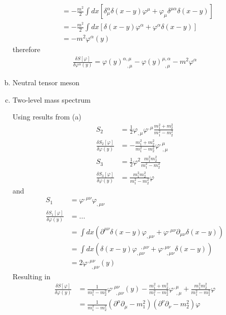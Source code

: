 \documentclass[../main.tex]{subfiles}
\begin{document}
\begin{enumerate}[(a)]
\begin{align}
&=-\frac{m^2}{2}\int dx\left[\delta_\mu^\alpha\delta(x-y)\varphi^\mu+\varphi_\mu\delta^{\mu\alpha}\delta(x-y)\right]\\
&=-\frac{m^2}{2}\int dx\left[\delta(x-y)\varphi^\alpha+\varphi^\alpha\delta(x-y)\right]\\
&=-m^2\varphi^\alpha(y)
\end{align}
therefore
\begin{align}
\frac{\delta S[\varphi]}{\delta\varphi^\alpha(y)}=\varphi(y)^{\alpha,\mu}_{\;\;\;,\mu}-\varphi(y)^{\mu,\alpha}_{\;\;,\mu}-m^2\varphi^\alpha
\end{align}

\item Neutral tensor meson

\item Two-level mass spectrum

Using results from (a)
\begin{align}
S_2&=\frac{1}{2}\varphi_{,\mu}\varphi^{,\mu}\frac{m_1^2+m_2^2}{m_1^2-m_2^2}\\
\frac{\delta S_2[\varphi]}{\delta\varphi(y)}&=-\frac{m_1^2+m_2^2}{m_1^2-m_2^2}\varphi^{,\mu}_{\;\;,\mu}\\
S_3&=\frac{1}{2}\varphi^2\frac{m_1^2m_2^2}{m_1^2-m_2^2}\\
\frac{\delta S_3[\varphi]}{\delta\varphi(y)}&=\frac{m_1^2m_2^2}{m_1^2-m_2^2}\varphi
\end{align}
and
\begin{align}
S_1&=\varphi^{,\mu\nu}\varphi_{,\mu\nu}\\
\frac{\delta S_1[\varphi]}{\delta\varphi(y)}
&=...\\
&=\int dx \left(\partial^{\mu\nu}\delta(x-y)\varphi_{,\mu\nu}+\varphi^{,\mu\nu}\partial_{\mu\nu}\delta(x-y)\right)\\
&=\int dx \left(\delta(x-y)\varphi_{,\mu\nu}^{\;\;\;,\mu\nu}+\varphi^{,\mu\nu}_{\;\;\;,\mu\nu}\delta(x-y)\right)\\
&=2\varphi^{,\mu\nu}_{\;\;\;,\mu\nu}(y)
\end{align}
Resulting in
\begin{align}
\frac{\delta S[\varphi]}{\delta\varphi(y)}
&=\frac{1}{m_1^2-m_2^2}\varphi^{,\mu\nu}_{\;\;\;,\mu\nu}(y)
-\frac{m_1^2+m_2^2}{m_1^2-m_2^2}\varphi^{,\mu}_{\;\;,\mu}
+\frac{m_1^2m_2^2}{m_1^2-m_2^2}\varphi\\
&=\frac{1}{m_1^2-m_2^2}(\partial^\mu\partial_{\mu}-m_1^2)(\partial^\nu\partial_{\nu}-m_2^2)\varphi
\end{align}
\end{enumerate}
\end{document}
